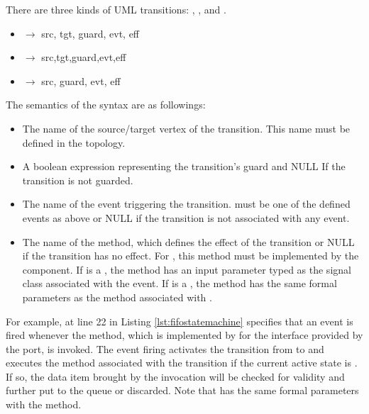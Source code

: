 \vskip 0.2cm
\noindent
{}
There are three kinds of UML transitions: , , and .

\begin{itemize}[\footnotesize]
	\itemsep0em
	\item {} $\rightarrow$  src, tgt, guard, evt, eff \tb{);}
	
	\item {}$\rightarrow$ src,tgt,guard,evt,eff \tb{);}
	
	\item {} $\rightarrow$  src, guard, evt, eff \tb{);}
\end{itemize}

The semantics of the syntax are as followings:
\begin{itemize}[\footnotesize]
	\itemsep0em
	\item {} The name of the source/target vertex of the transition. 
	This name must be defined in the topology.
	
	
	\item {} A boolean expression representing the transition's guard and NULL If the transition is not guarded.
	
	\item {} The name of the event triggering the transition. 
	 must be one of the defined events as above or NULL if the transition is not associated with any event.
	
	\item {} The name of the method, which defines the effect of the transition or NULL if the transition has no effect.
	For , this method must be implemented by the component.
	If  is a , the method has an input parameter typed as the signal class associated with the event.
	If  is a , the method has the same formal parameters as the method associated with .
\end{itemize}


For example,  at line 22 in Listing \ref{lst:fifostatemachine} specifies that an event is fired whenever the  method, which is implemented by  for the  interface provided by the  port, is invoked.
The event firing activates the transition from  to  and executes the  method associated with the transition if the current active state is .
If so, the data item brought by the invocation will be checked for validity and further put to the queue or discarded.
Note that  has the same formal parameters with the  method.

